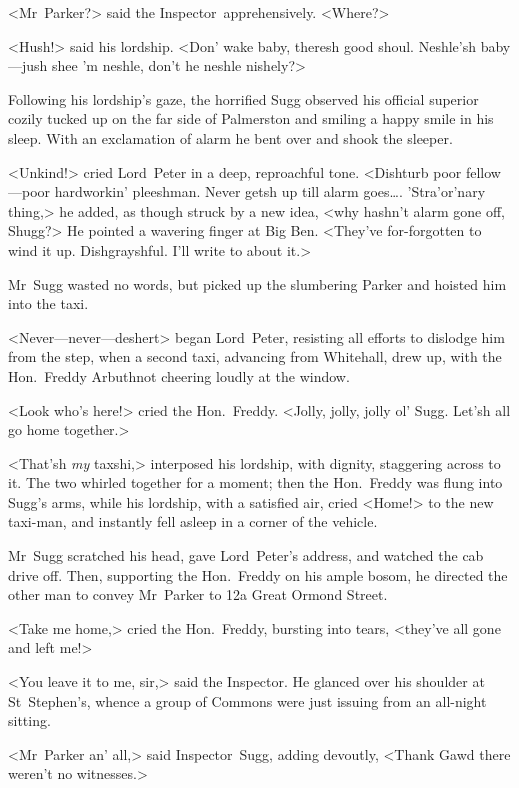 <Mr~Parker?> said the Inspector~apprehensively. <Where?>

<Hush!> said his lordship. <Don' wake baby, theresh good shoul.  Neshle'sh baby—jush shee 'm neshle, don't he neshle nishely?>

Following his lordship's gaze, the horrified Sugg observed his official superior cozily tucked up on the far side of Palmerston and smiling a happy smile in his sleep. With an exclamation of alarm he bent over and shook the sleeper.

<Unkind!> cried Lord~Peter in a deep, reproachful tone. <Dishturb poor fellow—poor hardworkin' pleeshman. Never getsh up till alarm goes\dots .  'Stra'or'nary thing,> he added, as though struck by a new idea, <why hashn't alarm gone off, Shugg?> He pointed a wavering finger at Big Ben. <They've for-forgotten to wind it up. Dishgrayshful. I'll write to  about it.>

Mr~Sugg wasted no words, but picked up the slumbering Parker and hoisted him into the taxi.

<Never—never—deshert\longdash> began Lord~Peter, resisting all efforts to dislodge him from the step, when a second taxi, advancing from Whitehall, drew up, with the Hon.~Freddy Arbuthnot cheering loudly at the window.

<Look who's here!> cried the Hon.~Freddy. <Jolly, jolly, jolly ol' Sugg. Let'sh all go home together.>

<That'sh \emph{my} taxshi,> interposed his lordship, with dignity, staggering across to it. The two whirled together for a moment; then the Hon.~Freddy was flung into Sugg's arms, while his lordship, with a satisfied air, cried <Home!> to the new taxi-man, and instantly fell asleep in a corner of the vehicle.

Mr~Sugg scratched his head, gave Lord~Peter's address, and watched the cab drive off. Then, supporting the Hon.~Freddy on his ample bosom, he directed the other man to convey Mr~Parker to 12a Great Ormond Street.

<Take me home,> cried the Hon.~Freddy, bursting into tears, <they've all gone and left me!>

<You leave it to me, sir,> said the Inspector. He glanced over his shoulder at St~Stephen's, whence a group of Commons were just issuing from an all-night sitting.

<Mr~Parker an' all,> said Inspector~Sugg, adding devoutly, <Thank Gawd there weren't no witnesses.>
